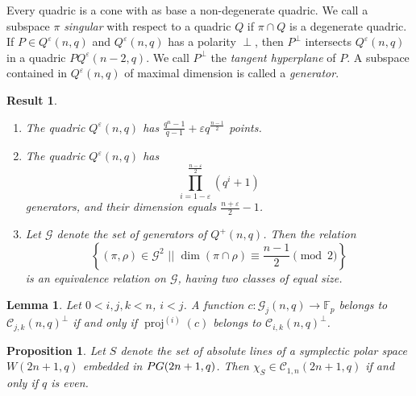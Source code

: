 \documentclass[10pt,a4paper]{amsart}
\newtheorem{res}{Result}
\newtheorem{lm}{Lemma}
\newtheorem{prop}{Proposition}
\newcommand{\FF}{\mathbb F}
\newcommand{\eps}{\varepsilon}
\newcommand{\mc}{\mathcal C}
\newcommand{\mg}{\mathcal G}
\newcommand{\pg}{\textnormal{PG}}
\DeclareMathOperator{\proj}{proj}
\newcommand{\sett}[2]{ \left\{ #1 \, \, || \, \, #2 \right \} }
\begin{document}
Every quadric is a cone with as base a non-degenerate quadric.
We call a subspace $\pi$ \emph{singular} with respect to a quadric $Q$ if $\pi \cap Q$ is a degenerate quadric.
If $P \in Q^\eps(n,q)$ and $Q^\eps(n,q)$ has a polarity $\perp$, then $P^\perp$ intersects $Q^\eps(n,q)$ in a quadric $P Q^\eps(n-2,q)$.
We call $P^\perp$ the \emph{tangent hyperplane} of $P$.
A subspace contained in $Q^\eps(n,q)$ of maximal dimension is called a \emph{generator}.
\begin{res}
 \label{Res:Quadrics}
 \begin{enumerate}
  \item The quadric $Q^\eps(n,q)$ has $\frac{q^n-1}{q-1} + \eps q^\frac{n-1}2$ points.
  \item \label{Res:Quadrics:Generators} The quadric $Q^\eps(n,q)$ has
  \[
   \prod_{i=1-\eps}^\frac{n-\eps}2 (q^i+1)
  \]
  generators, and their dimension equals $\frac{n+\eps}2-1$.
  \item \label{Res:Quadrics:Equivalence} Let $\mg$ denote the set of generators of $Q^+(n,q)$.
  Then the relation
  \[
   \sett{ (\pi, \rho) \in \mg^2 }{ \dim (\pi \cap \rho) \equiv \frac{n-1}2 \pmod 2 }
  \]
  is an equivalence relation on $\mg$, having two classes of equal size.
 \end{enumerate}
\end{res}

\begin{lm}\label{Lm:Proj}
Let $0<i,j,k<n$, $i<j$. A function $c: \mg_j(n,q) \to \FF_p$ belongs to  $\mc_{j,k}(n,q)^\perp$ if and only if $\proj^{(i)}(c)$ belongs to $\mc_{i,k}(n,q)^\perp$.
\end{lm}

\begin{prop}
 \label{Prop:Symplectic}
 Let $S$ denote the set of absolute lines of a symplectic polar space $W(2n+1,q)$ embedded in $\pg(2n+1,q)$. Then $\chi_S \in \mc_{1,n}(2n+1,q)$ if and only if $q$ is even.
\end{prop}
\end{document}
